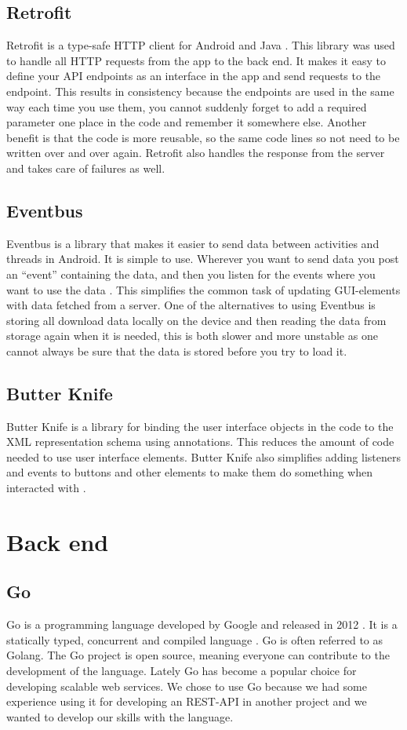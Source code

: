 \documentclass[../Main/thesis.tex]{subfiles}
\begin{document}
\subsection{Retrofit}
Retrofit is a type-safe HTTP client for Android and Java \citep{SquareInc.2017}.
This library was used to handle all HTTP requests from the app to the back end. 
It makes it easy to define your API endpoints as an interface in the app and send requests to the endpoint.
This results in consistency because the endpoints are used in the same way each time you use them, you cannot suddenly forget to add a required parameter one place in the code and remember it somewhere else.
Another benefit is that the code is more reusable, so the same code lines so not need to be written over and over again.
Retrofit also handles the response from the server and takes care of failures as well.

\subsection{Eventbus}
Eventbus is a library that makes it easier to send data between activities and threads in Android. 
It is simple to use.
Wherever you want to send data you post an ``event'' containing the data, and then you listen for the events where you want to use the data \citep{Greenrobot2016}.
This simplifies the common task of updating GUI-elements with data fetched from a server.
One of the alternatives to using Eventbus is storing all download data locally on the device and then reading the data from storage again when it is needed, this is both slower and more unstable as one cannot always be sure that the data is stored before you try to load it. 

\subsection{Butter Knife}
Butter Knife is a library for binding the user interface objects in the code to the XML representation schema using annotations.
This reduces the amount of code needed to use user interface elements. 
Butter Knife also simplifies adding listeners and events to buttons and other elements to make them do something when interacted with \citep{Wharton2018}.

\section{Back end}

\subsection{Go}
Go is a programming language developed by Google and released in 2012 \citep{Google2018a}.
It is a statically typed, concurrent and compiled language \citep{Pike2012}.
Go is often referred to as Golang. 
The Go project is open source, meaning everyone can contribute to the development of the language.
Lately Go has become a popular choice for developing scalable web services.
We chose to use Go because we had some experience using it for developing an REST-API in another project and we wanted to develop our skills with the language.
\end{document}
